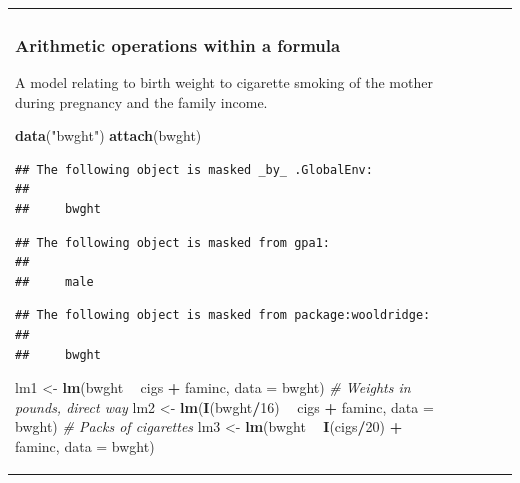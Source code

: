 \documentclass[]{book}
\newenvironment{Shaded}{\begin{snugshade}}{\end{snugshade}}
\newcommand{\CommentTok}[1]{\textcolor[rgb]{0.56,0.35,0.01}{\textit{#1}}}
\newcommand{\DataTypeTok}[1]{\textcolor[rgb]{0.13,0.29,0.53}{#1}}
\newcommand{\DecValTok}[1]{\textcolor[rgb]{0.00,0.00,0.81}{#1}}
\newcommand{\KeywordTok}[1]{\textcolor[rgb]{0.13,0.29,0.53}{\textbf{#1}}}
\newcommand{\NormalTok}[1]{#1}
\newcommand{\OperatorTok}[1]{\textcolor[rgb]{0.81,0.36,0.00}{\textbf{#1}}}
\newcommand{\StringTok}[1]{\textcolor[rgb]{0.31,0.60,0.02}{#1}}
\begin{document}
\begin{tabularx}{0.455555555555556\textwidth}{p{} p{} p{} p{} p{}}
\hypertarget{arithmetic-operations-within-a-formula}{%
\subsubsection{Arithmetic operations within a
formula}\label{arithmetic-operations-within-a-formula}}

A model relating to birth weight to cigarette smoking of the mother
during pregnancy and the family income.

\begin{Shaded}
\begin{Highlighting}[]
\KeywordTok{data}\NormalTok{(}\StringTok{"bwght"}\NormalTok{)}
\KeywordTok{attach}\NormalTok{(bwght)}
\end{Highlighting}
\end{Shaded}

\begin{verbatim}
## The following object is masked _by_ .GlobalEnv:
## 
##     bwght
\end{verbatim}

\begin{verbatim}
## The following object is masked from gpa1:
## 
##     male
\end{verbatim}

\begin{verbatim}
## The following object is masked from package:wooldridge:
## 
##     bwght
\end{verbatim}

\begin{Shaded}
\begin{Highlighting}[]
\NormalTok{lm1 <-}\StringTok{ }\KeywordTok{lm}\NormalTok{(bwght }\OperatorTok{~}\StringTok{ }\NormalTok{cigs }\OperatorTok{+}\StringTok{ }\NormalTok{faminc, }\DataTypeTok{data =}\NormalTok{ bwght)}
\CommentTok{# Weights in pounds, direct way}
\NormalTok{lm2 <-}\StringTok{ }\KeywordTok{lm}\NormalTok{(}\KeywordTok{I}\NormalTok{(bwght}\OperatorTok{/}\DecValTok{16}\NormalTok{) }\OperatorTok{~}\StringTok{ }\NormalTok{cigs }\OperatorTok{+}\StringTok{ }\NormalTok{faminc, }\DataTypeTok{data =}\NormalTok{ bwght)}
\CommentTok{# Packs of cigarettes}
\NormalTok{lm3 <-}\StringTok{ }\KeywordTok{lm}\NormalTok{(bwght }\OperatorTok{~}\StringTok{ }\KeywordTok{I}\NormalTok{(cigs}\OperatorTok{/}\DecValTok{20}\NormalTok{) }\OperatorTok{+}\StringTok{ }\NormalTok{faminc, }\DataTypeTok{data =}\NormalTok{ bwght)}
\end{Highlighting}
\end{Shaded}


\end{tabularx}
\end{document}
